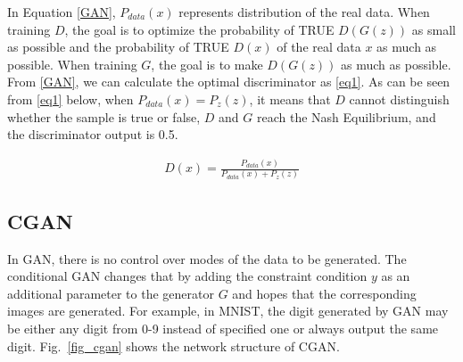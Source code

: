 \documentclass[conference]{IEEEtran}
\begin{document}
In Equation \eqref{GAN}, $P_{data}(x)$ represents distribution of the real data. When training $D$, the goal is to optimize the probability of TRUE $D(G(z))$ as small as possible and the probability of TRUE $D\left(x\right)$ of the real data $x$ as much as possible. When training $G$, the goal is to make $D(G(z))$ as much as possible. From \eqref{GAN}, we can calculate the optimal discriminator as \eqref{eq1}. As can be seen from \eqref{eq1} below, when $P_{data}\left(x\right)=P_z\left(z\right)$, it means that $D$ cannot distinguish whether the sample is true or false, $D$ and $G$ reach the Nash Equilibrium, and the discriminator output is 0.5.

\begin{equation}
\begin{split}
\label{eq1}
D(x)=\frac{P_{data}(x)}{P_{data}(x)+P_z(z)}
\end{split}
\end{equation}

\subsection{CGAN}
{\color{blue}In GAN, there is no control over modes of the data to be generated. The conditional GAN changes that by adding the constraint condition $y$ as an additional parameter to the generator $G$ and hopes that the corresponding images are generated. For example, in MNIST, the digit generated by GAN may be either any digit from 0-9 instead of specified one or always output the same digit. Fig.~\ref{fig_cgan} shows the network structure of CGAN.}


\end{document}
